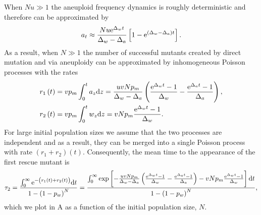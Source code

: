 \documentclass[12pt]{extarticle}
\renewcommand{\d}[1]{\ensuremath{\operatorname{d}\!{#1}}}
\renewcommand{\d}{{\rm d}}
\newcommand{\e}{{\rm e}}
\begin{document}
\begin{appendices}
When $Nu\gg1$ the aneuploid frequency dynamics is roughly deterministic and therefore can be approximated by 
\begin{equation}
a_t \approx \frac{Nu\e^{\Delta_wt}}{\Delta_w-\Delta_a}\left[1-\e^{\left(\Delta_w-\Delta_a\right)t}\right].
\end{equation}
As a result, when $N\gg1$ %
the number of successful mutants created by direct mutation and via aneuploidy can be approximated by inhomogeneous Poisson processes with the rates
\begin{align}
r_1\left(t\right)&=vp_m\int_0^ta_{z} \d z = \frac{uvNp_m}{\Delta_w-\Delta_a}\left(\frac{\e^{\Delta_wt}-1}{\Delta_w}-\frac{\e^{\Delta_at}-1}{\Delta_a}\right),\\
r_2\left(t\right)&=vp_m\int_0^tw_{z} \d z = vNp_m\frac{\e^{\Delta_w t}-1}{\Delta_w}.
\end{align}
For large initial population sizes we assume that the two processes are independent and as a result, they can be merged into a single Poisson process with rate $\left(r_1+r_2\right)\left(t\right)$.
Consequently, the mean time to the appearance of the first rescue mutant is
\begin{align}\label{meantimet2}
\tau_2 = 
\frac{\int_0^\infty\e^{-\left(r_1(t)+r_2(t)\right)} \d t}{1-\left(1-p_w\right)^N} = 
\frac{\int_0^\infty\exp\left[-\frac{uvNp_m}{\Delta_w-\Delta_a}\left(\frac{\e^{\Delta_w t}-1}{\Delta_w}-\frac{\e^{\Delta_a t}-1}{\Delta_a}\right)-vNp_m\frac{\e^{\Delta_w t}-1}{\Delta_w}\right] \d t}{1-\left(1-p_w\right)^N},
\end{align}
which we plot in A as a function of the initial population size, $N$.


\end{appendices}
\end{document}
